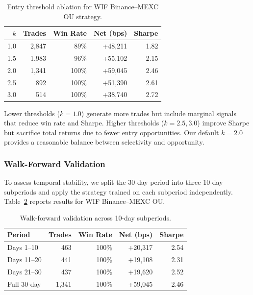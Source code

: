 \documentclass[sigconf,nonacm=false]{acmart}
\begin{document}
\begin{table}[h]
\caption{Entry threshold ablation for WIF Binance--MEXC OU strategy.}
\label{tab:ablation_k}
\begin{tabular}{rrrrr}
\toprule
$k$ & \textbf{Trades} & \textbf{Win Rate} & \textbf{Net (bps)} & \textbf{Sharpe} \\
\midrule
1.0 & 2,847 & 89\% & +48,211 & 1.82 \\
1.5 & 1,983 & 96\% & +55,102 & 2.15 \\
2.0 & 1,341 & 100\% & +59,045 & 2.46 \\
2.5 & 892  & 100\% & +51,390 & 2.61 \\
3.0 & 514  & 100\% & +38,740 & 2.72 \\
\bottomrule
\end{tabular}
\end{table}

Lower thresholds ($k=1.0$) generate more trades but include marginal signals that reduce win rate and Sharpe. Higher thresholds ($k=2.5, 3.0$) improve Sharpe but sacrifice total returns due to fewer entry opportunities. Our default $k=2.0$ provides a reasonable balance between selectivity and opportunity.

\subsubsection{Walk-Forward Validation}

To assess temporal stability, we split the 30-day period into three 10-day subperiods and apply the strategy trained on each subperiod independently. Table~\ref{tab:walkforward} reports results for WIF Binance--MEXC OU.

\begin{table}[h]
\caption{Walk-forward validation across 10-day subperiods.}
\label{tab:walkforward}
\begin{tabular}{lrrrr}
\toprule
\textbf{Period} & \textbf{Trades} & \textbf{Win Rate} & \textbf{Net (bps)} & \textbf{Sharpe} \\
\midrule
Days 1--10   & 463  & 100\% & +20,317 & 2.54 \\
Days 11--20  & 441  & 100\% & +19,108 & 2.31 \\
Days 21--30  & 437  & 100\% & +19,620 & 2.52 \\
\midrule
Full 30-day  & 1,341 & 100\% & +59,045 & 2.46 \\
\bottomrule
\end{tabular}
\end{table}
\end{document}
